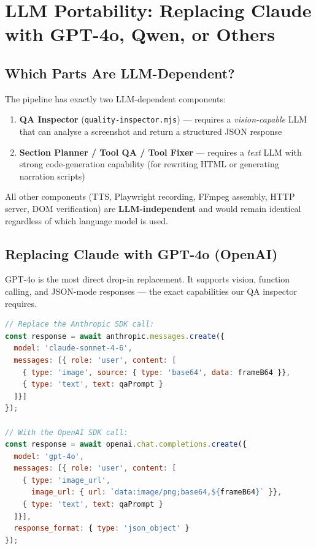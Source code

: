 \documentclass[12pt,a4paper]{article}
\begin{document}
\section{LLM Portability: Replacing Claude with GPT-4o, Qwen, or Others}
\label{sec:portability}

\subsection{Which Parts Are LLM-Dependent?}

The pipeline has exactly two LLM-dependent components:

\begin{enumerate}[leftmargin=2em]
  \item \textbf{QA Inspector} (\texttt{quality-inspector.mjs}) --- requires a
        \emph{vision-capable} LLM that can analyse a screenshot and return a
        structured JSON response
  \item \textbf{Section Planner / Tool QA / Tool Fixer} --- requires a \emph{text}
        LLM with strong code-generation capability (for rewriting HTML or
        generating narration scripts)
\end{enumerate}

All other components (TTS, Playwright recording, FFmpeg assembly, HTTP server,
DOM verification) are \textbf{LLM-independent} and would remain identical
regardless of which language model is used.

\subsection{Replacing Claude with GPT-4o (OpenAI)}

GPT-4o is the most direct drop-in replacement. It supports vision, function
calling, and JSON-mode responses --- the exact capabilities our QA inspector
requires.

\begin{lstlisting}[language=JavaScript,caption=QA inspector with GPT-4o]
// Replace the Anthropic SDK call:
const response = await anthropic.messages.create({
  model: 'claude-sonnet-4-6',
  messages: [{ role: 'user', content: [
    { type: 'image', source: { type: 'base64', data: frameB64 }},
    { type: 'text', text: qaPrompt }
  ]}]
});

// With the OpenAI SDK call:
const response = await openai.chat.completions.create({
  model: 'gpt-4o',
  messages: [{ role: 'user', content: [
    { type: 'image_url',
      image_url: { url: `data:image/png;base64,${frameB64}` }},
    { type: 'text', text: qaPrompt }
  ]}],
  response_format: { type: 'json_object' }
});
\end{lstlisting}
\end{document}
